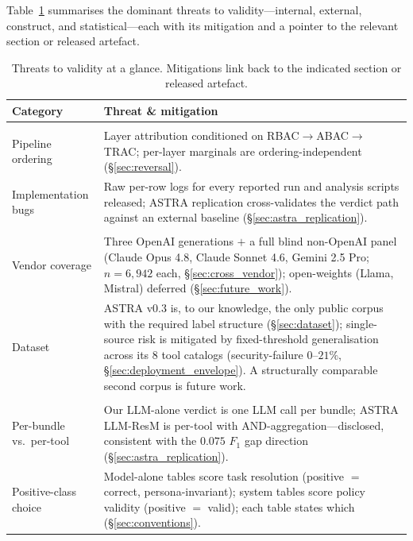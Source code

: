 \documentclass[sigconf,review,anonymous]{acmart}
\begin{document}
Table~\ref{tab:threats} summarises the dominant threats to validity---internal, external, construct, and statistical---each with its mitigation and a pointer to the relevant section or released artefact.

\begin{table}[!t]
\centering
\caption{Threats to validity at a glance. Mitigations link back to the indicated section or released artefact.}
\label{tab:threats}
\scriptsize
\setlength{\tabcolsep}{3pt}
\begin{tabularx}{\columnwidth}{@{}>{\raggedright\arraybackslash}p{1.8cm}>{\raggedright\arraybackslash}X@{}}
\toprule
\textbf{Category} & \textbf{Threat \& mitigation} \\
\midrule
\multicolumn{2}{@{}l}{\textit{Internal}} \\
Pipeline ordering & Layer attribution conditioned on RBAC$\to$ABAC$\to$TRAC; per-layer marginals are ordering-independent (\S\ref{sec:reversal}). \\
Implementation bugs & Raw per-row logs for every reported run and analysis scripts released; ASTRA replication cross-validates the verdict path against an external baseline (\S\ref{sec:astra_replication}). \\
\midrule
\multicolumn{2}{@{}l}{\textit{External}} \\
Vendor coverage & Three OpenAI generations $+$ a full blind non-OpenAI panel (Claude Opus 4.8, Claude Sonnet 4.6, Gemini 2.5 Pro; $n\!=\!6{,}942$ each, \S\ref{sec:cross_vendor}); open-weights (Llama, Mistral) deferred (\S\ref{sec:future_work}). \\
Dataset & ASTRA v0.3 is, to our knowledge, the only public corpus with the required label structure (\S\ref{sec:dataset}); single-source risk is mitigated by fixed-threshold generalisation across its $8$ tool catalogs (security-failure $0$--$21\%$, \S\ref{sec:deployment_envelope}). A structurally comparable second corpus is future work. \\
\midrule
\multicolumn{2}{@{}l}{\textit{Construct}} \\
Per-bundle vs.\ per-tool & Our LLM-alone verdict is one LLM call per bundle; ASTRA LLM-ResM is per-tool with AND-aggregation---disclosed, consistent with the $0.075$ $F_1$ gap direction (\S\ref{sec:astra_replication}). \\
Positive-class choice & Model-alone tables score task resolution (positive $=$ correct, persona-invariant); system tables score policy validity (positive $=$ valid); each table states which (\S\ref{sec:conventions}). \\

\end{tabularx}
\end{table}
\end{document}
